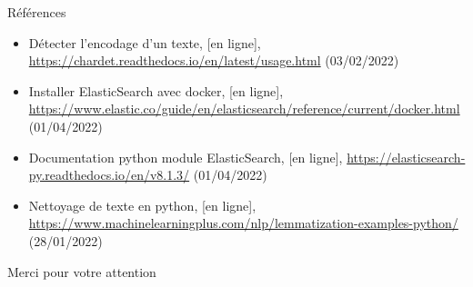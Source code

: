\documentclass[xelatex,11pt, xcolor=dvipsnames]{beamer}
\begin{document}
  \begin{frame}{Références}%
  \renewcommand*{\bibfont}{\footnotesize}
  \nocite{*}
  \printbibliography[heading=none]
  \begin{itemize}
  	\item Détecter l'encodage d'un texte, [en ligne], \url{https://chardet.readthedocs.io/en/latest/usage.html} (03/02/2022)
  	\item Installer ElasticSearch avec docker, [en ligne], \url{https://www.elastic.co/guide/en/elasticsearch/reference/current/docker.html} (01/04/2022)
  	\item Documentation python module ElasticSearch, [en ligne], \url{https://elasticsearch-py.readthedocs.io/en/v8.1.3/} (01/04/2022)
  	\item Nettoyage de texte en python, [en ligne], \url{https://www.machinelearningplus.com/nlp/lemmatization-examples-python/}       (28/01/2022)
  \end{itemize}
\end{frame}

\begin{frame}
  \begin{block}{}
  \centering
  Merci pour votre attention
  \end{block}
\end{frame}
\end{document}

